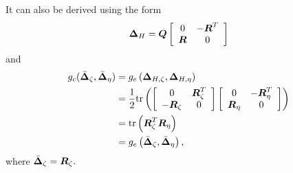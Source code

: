 \documentclass[11pt]{article}
\begin{document}
It can also be derived using the form
\begin{align*}
\boldsymbol{\Delta}_{H} = \boldsymbol{Q}\left[\begin{array}{cc}
0 & -\boldsymbol{R}^{T} \\ 
\boldsymbol{R} & 0
\end{array} \right]
\end{align*} 
and 
\begin{align}
g_{c}(\bar{\boldsymbol{\Delta}}_{\zeta}, \bar{\boldsymbol{\Delta}}_{\eta}) &= g_{e}\left( \boldsymbol{\Delta}_{H,\zeta}, \boldsymbol{\Delta}_{H,\eta} \right)\nonumber\\
&=\frac{1}{2}\mathrm{tr}\left(\left[\begin{array}{cc}
0 & \boldsymbol{R}_{\zeta}^{T} \\ 
-\boldsymbol{R}_{\zeta} & 0
\end{array}\right]\left[\begin{array}{cc}
0 & -\boldsymbol{R}_{\eta}^{T} \\ 
\boldsymbol{R}_{\eta} & 0
\end{array}  \right] \right) \nonumber\\
&= \mathrm{tr}\left(\boldsymbol{R}_{\zeta}^{T}\boldsymbol{R}_{\eta} \right) \nonumber\\
&=g_{e}\left( \bar{\boldsymbol{\Delta}}_{\zeta}, \bar{\boldsymbol{\Delta}}_{\eta}\right),  \label{eqn: can_metric_Grass}
\end{align} where $\bar{\boldsymbol{\Delta}}_{\zeta} = \boldsymbol{R}_{\zeta}.$ 
\end{document}
